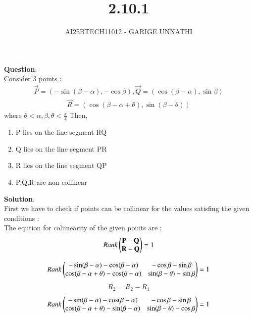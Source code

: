 \documentclass[journal]{IEEEtran}
\begin{document}



\title{2.10.1}
\author{AI25BTECH11012 - GARIGE UNNATHI}
{\let\newpage\relax\maketitle}


\renewcommand{\thefigure}{\theenumi}
\renewcommand{\thetable}{\theenumi}
\setlength{\intextsep}{10pt} %



\vspace{-1cm}

\textbf{Question}:\\
Consider 3 points :
 \begin{align*}
     \vec{P} = (-\sin(\beta - \alpha),-\cos\beta) , \vec{Q} = (\cos(\beta - \alpha),\sin\beta)
 \end{align*}
\begin{align*}
    \vec{R} = (\cos(\beta - \alpha + \theta),\sin(\beta - \theta))
\end{align*}
where $\theta < \alpha,\beta,\theta < \frac{\pi}{4}$ Then,
\begin{enumerate}
\item  P lies on the line segment RQ
\item  Q lies on the line segment PR
\item  R lies on the line segment QP
\item  P,Q,R are non-collinear
\end{enumerate}

\textbf{Solution}:\\
First we have to check if points can be collinear for the values satisfing the given conditions :\\

The eqution for coliinearity of the given points are :\\
\begin{align}
   Rank\begin{pmatrix}\mathbf{P} - \mathbf{Q}\\
               \mathbf{R} - \mathbf{Q} \end{pmatrix} = 1
\end{align}


\begin{align}
    Rank\begin{pmatrix}-\sin(\beta - \alpha) - \cos(\beta - \alpha) & -\cos\beta - \sin\beta \\
               \cos(\beta - \alpha + \theta) - \cos(\beta - \alpha) & \sin(\beta - \theta) - \sin\beta \end{pmatrix} = 1\\
\end{align} 
\begin{align}
     R_2 = R_2 - R_1
\end{align}
\begin{align}
Rank\begin{pmatrix}-\sin(\beta - \alpha) - \cos(\beta - \alpha) & -\cos\beta - \sin\beta \\
               \cos(\beta - \alpha + \theta) - \sin(\beta - \alpha) & \sin(\beta - \theta) - \cos\beta \end{pmatrix} = 1
\end{align}
\end{document}
